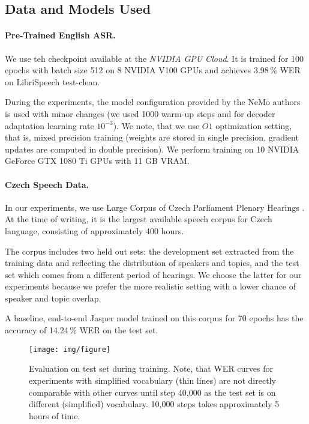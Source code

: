 \subsection{Data and Models Used}


\paragraph{Pre-Trained English ASR.}

We use teh checkpoint available at the \textit{NVIDIA GPU Cloud}. It is trained for 100 epochs with batch size 512 on 8 NVIDIA V100 GPUs and achieves 3.98\,\% WER on LibriSpeech  test-clean.

During the experiments, the model configuration provided by the NeMo authors is used with minor changes (we used 1000 warm-up steps and for decoder adaptation learning rate $10^{-3}$). We note, that we use $O1$ optimization setting, that is, mixed precision training (weights are stored in single precision, gradient updates are computed in double precision). We perform training on 10 NVIDIA GeForce GTX 1080 Ti GPUs with 11 GB VRAM.


\paragraph{Czech Speech Data.}
In our experiments, we use Large Corpus of Czech Parliament Plenary Hearings . At the time of writing, it is the largest available speech corpus for Czech language, consisting of approximately 400 hours.

The corpus includes two held out sets: the development set extracted from the training data and reflecting the distribution of speakers and topics, and the test set which comes from a different period of hearings. We choose the latter for our experiments because we prefer the more realistic setting with a lower chance of speaker and topic overlap.

A baseline, end-to-end Jasper model trained on this corpus for 70 epochs has the accuracy of 14.24\,\% WER on the test set.

\begin{landscape}
	\begin{figure}[t]
		\texttt{[image: img/figure]}
		\caption{Evaluation on test set during training. %
			Note, that WER curves for experiments with simplified vocabulary (thin lines) are not directly comparable with other curves until step 40,000 as the test set is on different (simplified) vocabulary. 10,000 steps takes approximately 5 hours of time.}
		\label{fig:training}
	\end{figure}
\end{landscape}


